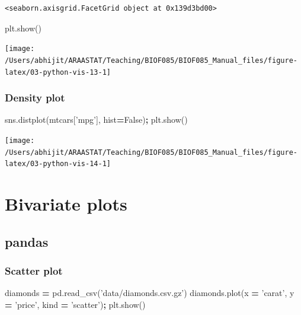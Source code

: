 \documentclass[
  letterpaper,
]{scrbook}
\newenvironment{Shaded}{\begin{snugshade}}{\end{snugshade}}
\newcommand{\NormalTok}[1]{#1}
\newcommand{\OperatorTok}[1]{\textcolor[rgb]{0.81,0.36,0.00}{\textbf{#1}}}
\newcommand{\StringTok}[1]{\textcolor[rgb]{0.31,0.60,0.02}{#1}}
\newcommand{\VariableTok}[1]{\textcolor[rgb]{0.00,0.00,0.00}{#1}}
\begin{document}
\begin{verbatim}
<seaborn.axisgrid.FacetGrid object at 0x139d3bd00>
\end{verbatim}

\begin{Shaded}
\begin{Highlighting}[]
\NormalTok{plt.show()}
\end{Highlighting}
\end{Shaded}

\begin{center}\texttt{[image: /Users/abhijit/ARAASTAT/Teaching/BIOF085/BIOF085\_Manual\_files/figure-latex/03-python-vis-13-1]} \end{center}

\hypertarget{density-plot-1}{%
\subsubsection{Density plot}\label{density-plot-1}}

\begin{Shaded}
\begin{Highlighting}[]
\NormalTok{sns.distplot(mtcars[}\StringTok{'mpg'}\NormalTok{], hist}\OperatorTok{=}\VariableTok{False}\NormalTok{)}\OperatorTok{;}
\NormalTok{plt.show()}
\end{Highlighting}
\end{Shaded}

\begin{center}\texttt{[image: /Users/abhijit/ARAASTAT/Teaching/BIOF085/BIOF085\_Manual\_files/figure-latex/03-python-vis-14-1]} \end{center}

\hypertarget{bivariate-plots}{%
\section{Bivariate plots}\label{bivariate-plots}}

\hypertarget{pandas-2}{%
\subsection{pandas}\label{pandas-2}}

\hypertarget{scatter-plot}{%
\subsubsection{Scatter plot}\label{scatter-plot}}

\begin{Shaded}
\begin{Highlighting}[]
\NormalTok{diamonds }\OperatorTok{=}\NormalTok{ pd.read_csv(}\StringTok{'data/diamonds.csv.gz'}\NormalTok{)}
\NormalTok{diamonds.plot(x }\OperatorTok{=} \StringTok{'carat'}\NormalTok{, y }\OperatorTok{=} \StringTok{'price'}\NormalTok{, kind }\OperatorTok{=} \StringTok{'scatter'}\NormalTok{)}\OperatorTok{;}
\NormalTok{plt.show()}
\end{Highlighting}
\end{Shaded}
\end{document}
